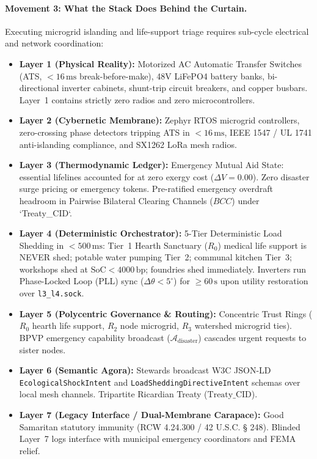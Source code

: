 \paragraph{Movement 3: What the Stack Does Behind the Curtain.}
Executing microgrid islanding and life-support triage requires sub-cycle electrical and network coordination:
\begin{itemize}
    \item \textbf{Layer 1 (Physical Reality):} Motorized AC Automatic Transfer Switches (ATS, $< 16\,\mathrm{ms}$ break-before-make), 48V LiFePO4 battery banks, bi-directional inverter cabinets, shunt-trip circuit breakers, and copper busbars. Layer~1 contains strictly zero radios and zero microcontrollers.
    \item \textbf{Layer 2 (Cybernetic Membrane):} Zephyr RTOS microgrid controllers, zero-crossing phase detectors tripping ATS in $< 16\,\mathrm{ms}$, IEEE 1547 / UL 1741 anti-islanding compliance, and SX1262 LoRa mesh radios.
    \item \textbf{Layer 3 (Thermodynamic Ledger):} Emergency Mutual Aid State: essential lifelines accounted for at zero exergy cost ($\Delta V = 0.00$). Zero disaster surge pricing or emergency tokens. Pre-ratified emergency overdraft headroom in Pairwise Bilateral Clearing Channels ($BCC$) under `Treaty\_CID`.
    \item \textbf{Layer 4 (Deterministic Orchestrator):} 5-Tier Deterministic Load Shedding in $< 500\,\mathrm{ms}$: Tier~1 Hearth Sanctuary ($R_0$) medical life support is NEVER shed; potable water pumping Tier~2; communal kitchen Tier~3; workshops shed at $\mathrm{SoC} < 4000\,\mathrm{bp}$; foundries shed immediately. Inverters run Phase-Locked Loop (PLL) sync ($\Delta \theta < 5^\circ$) for $\ge 60\,\mathrm{s}$ upon utility restoration over \texttt{l3\_l4.sock}.
    \item \textbf{Layer 5 (Polycentric Governance \& Routing):} Concentric Trust Rings ($R_0$ hearth life support, $R_2$ node microgrid, $R_3$ watershed microgrid ties). BPVP emergency capability broadcast ($\mathcal{A}_{\mathrm{disaster}}$) cascades urgent requests to sister nodes.
    \item \textbf{Layer 6 (Semantic Agora):} Stewards broadcast W3C JSON-LD \texttt{EcologicalShockIntent} and \texttt{LoadSheddingDirectiveIntent} schemas over local mesh channels. Tripartite Ricardian Treaty ($\mathrm{Treaty\_CID}$).
    \item \textbf{Layer 7 (Legacy Interface / Dual-Membrane Carapace):} Good Samaritan statutory immunity (RCW 4.24.300 / 42 U.S.C. § 248). Blinded Layer~7 logs interface with municipal emergency coordinators and FEMA relief.
\end{itemize}


